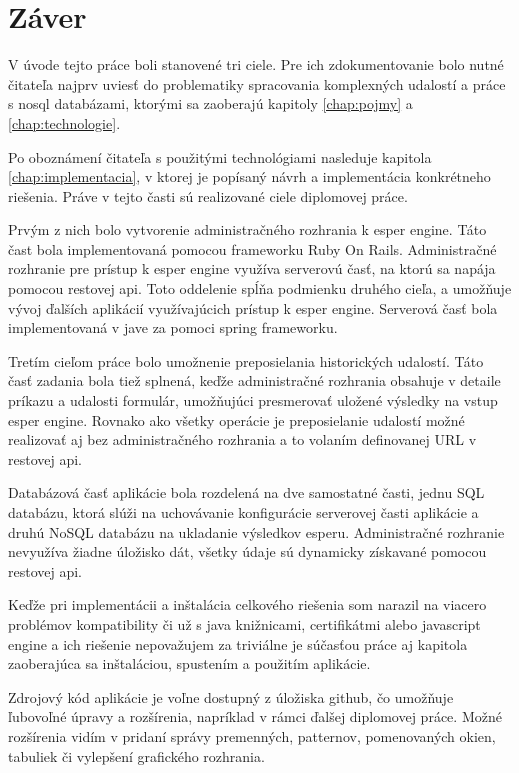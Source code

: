 \chapter*{Záver}

V úvode tejto práce boli stanovené tri ciele. Pre ich zdokumentovanie bolo nutné čitateľa najprv uviesť do problematiky spracovania komplexných udalostí a práce s nosql databázami, ktorými sa zaoberajú kapitoly \ref{chap:pojmy} a \ref{chap:technologie}.

Po oboznámení čitateľa s použitými technológiami nasleduje kapitola \ref{chap:implementacia}, v ktorej je popísaný návrh a implementácia konkrétneho riešenia. Práve v tejto časti sú realizované ciele diplomovej práce.

Prvým z nich bolo vytvorenie administračného rozhrania k esper engine. Táto čast bola implementovaná pomocou frameworku Ruby On Rails. Administračné rozhranie pre prístup k esper engine využíva serverovú časť, na ktorú sa napája pomocou restovej api. Toto oddelenie spĺňa podmienku druhého cieľa, a umožňuje vývoj ďalších aplikácií využívajúcich prístup k esper engine. Serverová časť bola implementovaná v jave za pomoci spring frameworku.

Tretím cieľom práce bolo umožnenie preposielania historických udalostí. Táto časť zadania bola tiež splnená, keďže administračné rozhrania obsahuje v detaile príkazu a udalosti formulár, umožňujúci presmerovať uložené výsledky na vstup esper engine. Rovnako ako všetky operácie je preposielanie udalostí možné realizovať aj bez administračného rozhrania a to volaním definovanej URL v restovej api.

Databázová časť aplikácie bola rozdelená na dve samostatné časti, jednu SQL databázu, ktorá slúži na uchovávanie konfigurácie serverovej časti aplikácie a druhú NoSQL databázu na ukladanie výsledkov esperu. Administračné rozhranie nevyužíva žiadne úložisko dát, všetky údaje sú dynamicky získavané pomocou restovej api.

Keďže pri implementácii a inštalácia celkového riešenia som narazil na viacero problémov kompatibility či už s java knižnicami, certifikátmi alebo javascript engine a ich riešenie nepovažujem za triviálne je súčasťou práce aj kapitola zaoberajúca sa inštaláciou, spustením a použitím aplikácie.

Zdrojový kód aplikácie je voľne dostupný z úložiska github, čo umožňuje ľubovoľné úpravy a rozšírenia, napríklad v rámci ďalšej diplomovej práce. Možné rozšírenia vidím v pridaní správy premenných, patternov, pomenovaných okien, tabuliek či vylepšení grafického rozhrania.

\emptydoublepage

